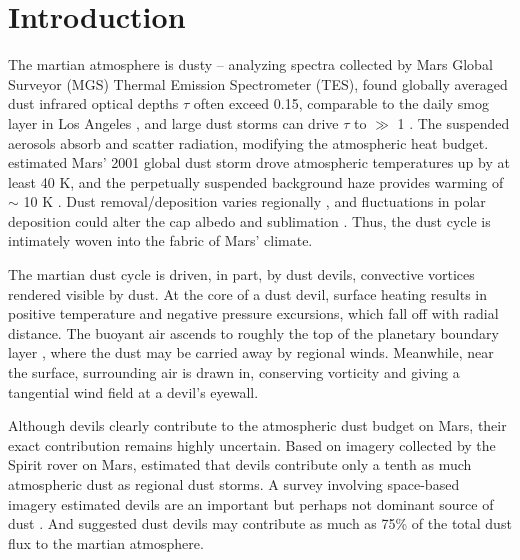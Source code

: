 \documentclass{aastex63}
\begin{document}
\section{Introduction} \label{sec:introduction}
The martian atmosphere is dusty -- analyzing spectra collected by Mars Global Surveyor (MGS) Thermal Emission Spectrometer (TES), \citet{2004Icar..167..148S} found globally averaged dust infrared optical depths $\tau$ often exceed 0.15, comparable to the daily smog layer in Los Angeles \citep{2007JGRD..11222S21R}, and large dust storms can drive $\tau$ to $\gg$ 1 \citep{2002Icar..157..259S}. The suspended aerosols absorb and scatter radiation, modifying the atmospheric heat budget. \citet{2002Icar..157..259S} estimated Mars' 2001 global dust storm drove atmospheric temperatures up by at least 40 K, and the perpetually suspended background haze provides warming of $\sim$ 10 K \citep{2004JGRE..10911006B}. Dust removal/deposition varies regionally \citep{2006JGRE..111.6008K}, and fluctuations in polar deposition could alter the cap albedo and sublimation \citep{1995JGR...100.5501H}. Thus, the dust cycle is intimately woven into the fabric of Mars' climate.

The martian dust cycle is driven, in part, by dust devils, convective vortices rendered visible by dust. At the core of a dust devil, surface heating results in positive temperature and negative pressure excursions, which fall off with radial distance. The buoyant air ascends to roughly the top of the planetary boundary layer \citep{2015Icar..260..246F}, where the dust may be carried away by regional winds. Meanwhile, near the surface, surrounding air is drawn in, conserving vorticity and giving a tangential wind field at a devil's eyewall. 

Although devils clearly contribute to the atmospheric dust budget on Mars, their exact contribution remains highly uncertain. Based on imagery collected by the Spirit rover on Mars, \citet{2006JGRE..11112S09G} estimated that devils contribute only a tenth as much atmospheric dust as regional dust storms. A survey involving space-based imagery estimated devils are an important but perhaps not dominant source of dust \citep{2006JGRE..11112002C}. And \citet{2016SSRv..203...89F} suggested dust devils may contribute as much as 75\% of the total dust flux to the martian atmosphere. 
\end{document}
